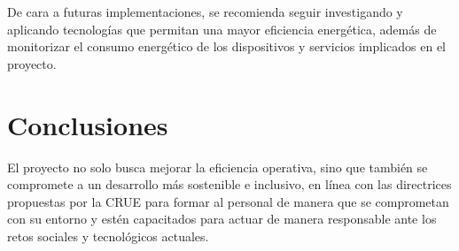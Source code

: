 De cara a futuras implementaciones, se recomienda seguir investigando y aplicando tecnologías que permitan una mayor
eficiencia energética, además de monitorizar el consumo energético de los dispositivos y servicios implicados en el
proyecto.

\section{Conclusiones}

El proyecto no solo busca mejorar la eficiencia operativa, sino que también se compromete a un desarrollo más sostenible
e inclusivo, en línea con las directrices propuestas por la CRUE\cite{crueSostenibilidad} para formar al personal
de manera que se comprometan con su entorno y estén capacitados para actuar de manera responsable ante los retos
sociales y tecnológicos actuales.